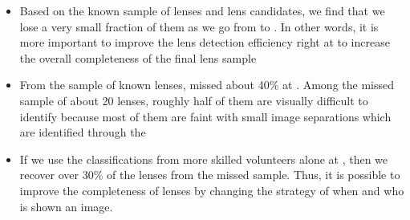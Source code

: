 \documentclass[useAMS,usenatbib,a4paper]{mn2e}
\begin{document}
\begin{itemize}
\item Based on the known sample of lenses and lens candidates, we find
that we lose a very small fraction of them as we go from \StageOne to
\StageTwo. In other words, it is more important to improve the lens
detection efficiency right at \StageOne to increase the overall
completeness of the final lens sample

\item From the sample of known lenses, \sw missed about 40\% at \StageOne.
Among the missed sample of about 20 lenses, roughly half of them are
visually difficult to identify because most of them are faint with small
image separations which are identified through the \rf

\item If we use the classifications from more skilled volunteers alone
at \StageOne, then we recover over 30\% of the lenses from the missed
sample. Thus, it is possible to improve the completeness of lenses by
changing the strategy of when and who is shown an image.

\end{itemize}

\end{document}
